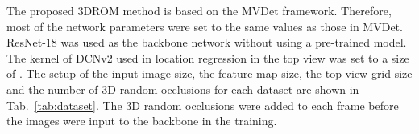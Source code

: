 \documentclass[runningheads]{llncs}
\begin{document}
\begin{table}
		\begin{center}
			\caption{Datasets used for performance evaluation.}
			\label{tab:dataset}
		\end{center}		
	\end{table}
	
	
	The proposed 3DROM method is based on the MVDet framework. Therefore, most of the network parameters were set to the same values as those in MVDet. ResNet-18 was used as the backbone network without using a pre-trained model. The kernel of DCNv2 used in location regression in the top view was set to a size of . The setup of the input image size, the feature map size, the top view grid size and the number of 3D random occlusions for each dataset are shown in Tab.~\ref{tab:dataset}. The 3D random occlusions were added to each frame before the images were input to the backbone in the training.
	
\end{document}
